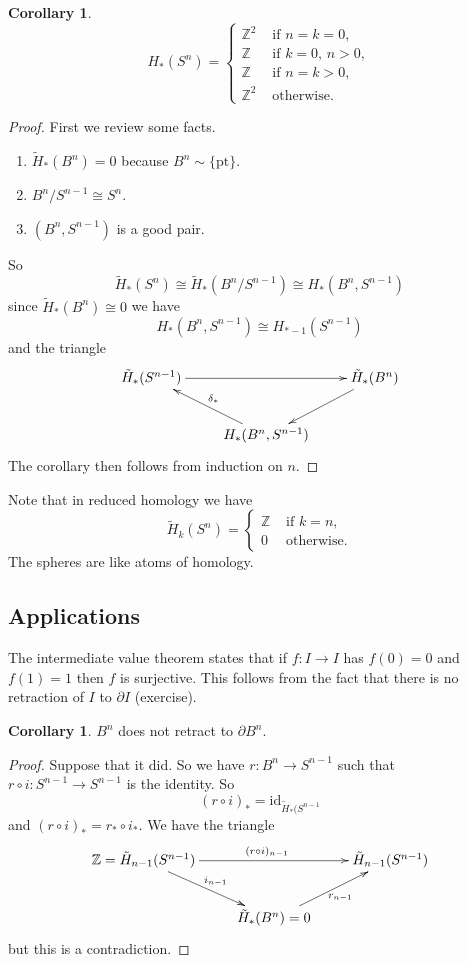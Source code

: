 \documentclass[12pt]{article}
\theoremstyle{definition}
\newtheorem{cor}[thm]{Corollary}
\theoremstyle{definition}
\newcommand{\ZZ}{\mathbb{Z}}
\renewcommand{\H}{H_*}
\begin{document}
\begin{cor}
\[
\H(S^n) =\begin{cases}
\ZZ^2 &\text{ if } n= k =0,\\
\ZZ &\text{ if } k =0,\,n>0,\\
\ZZ &\text{ if } n= k >0,\\
\ZZ^2 &\text{ otherwise}.
\end{cases} 
\]
\end{cor}
\begin{proof}
First we review some facts.
\begin{enumerate}
\item
$\tilde\H(B^n) = 0$ because $B^n \sim \{\text{pt}\}$.
\item $B^n /S^{n-1} \cong S^n$.
\item $(B^n, S^{n-1})$ is a good pair.
\end{enumerate}
So
\[
\tilde\H(S^n) \cong \tilde\H(B^n/S^{n-1}) \cong \H(B^n, S^{n-1})
\]
since $\tilde\H(B^n) \cong 0$ we have
\[
\H(B^n,S^{n-1}) \cong H_{*-1}(S^{n-1})
\]
and the triangle
\[
\xymatrix
{
 \tilde\H(S^{n-1}) \ar[rr]& &\tilde\H(B^n)\ar[dl] \\
 &\H(B^n, S^{n-1}) \ar[ul]_{\delta_*}&
}
\]
The corollary then follows from induction on $n$.
\end{proof}

Note that in reduced homology we have 
\[
\tilde H_k(S^n) =\begin{cases}
\ZZ &\text{ if } k=n,\\
0 &\text{ otherwise}.
\end{cases}
\]
The spheres are like atoms of homology.

\subsection{Applications}
The intermediate value theorem states that if $f\colon I \to I$ has $f(0) = 0$ and $f(1) = 1$ then $f$ is surjective.
This follows from the fact that there is no retraction of $I$ to $\partial I$ (exercise).

\begin{cor}
$B^n$ does not retract to $\partial B^n$.
\end{cor}
\begin{proof}
Suppose that it did.
So we have $r\colon B^n \to S^{n-1}$ such that $r\circ i\colon S^{n-1} \to S^{n-1}$ is the identity.
So \[(r\circ i)_* = \text{id}_{\tilde\H(S^{n-1}}\]
and $(r\circ i)_* = r_* \circ i_*$.
We have the triangle
\[
\xymatrix
{
 \ZZ=\tilde H_{n-1}(S^{n-1})\ar[dr]^{i_{n-1}} \ar[rr]^{(r\circ i)_{n-1}}& &\tilde H_{n-1}(S^{n-1}) \\
 &\tilde\H(B^n)= 0 \ar[ur]_{r_{n-1}}&
}
\]
but this is a contradiction.
\end{proof}
\end{document}
